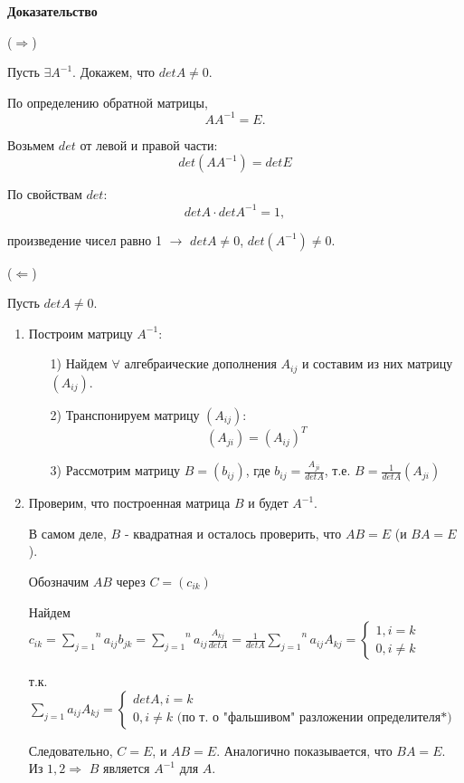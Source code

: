 {\bf {Доказательство}}

($\Rightarrow$)  

Пусть $\exists A^{-1}$. Докажем, что $detA \ne 0$.

По определению обратной матрицы, 
$$AA^{-1} = E.$$

Возьмем $det$ от левой и правой части:
$$det(AA^{-1}) = detE$$

По свойствам $det$:
$$detA\cdot detA^{-1} = 1,$$

произведение чисел равно 1 $\rightarrow$ $detA \ne 0$, $det(A^{-1}) \ne 0$.

\vspace*{15pt}

($\Leftarrow$)

Пусть $detA \ne 0$.

\begin{enumerate}
    \item Построим матрицу $A^{-1}:$
    \begin{enumerate}
        \item[1)] Найдем $\forall$ алгебраические дополнения $A_{ij}$ и составим из них матрицу $(A_{ij})$.
        \item[2)] Транспонируем матрицу $(A_{ij}):$
    $$(A_{ji}) = (A_{ij})^T$$
        \item[3)] Рассмотрим матрицу $B = (b_{ij})$, где $b_{ij} = \frac{A_{ji}}{detA}$, т.е. $B = \frac{1}{detA}(A_{ji})$
    \end{enumerate}
    \item Проверим, что построенная матрица $B$ и будет $A^{-1}$.

    В самом деле, $B$ - квадратная и осталось проверить, что $AB = E$ (и $BA = E$).

    Обозначим $AB$ через $C = (c_{ik})$

    Найдем $c_{ik} = \overset{n}{\underset{j = 1}{\sum}}a_{ij}b_{jk} = \overset{n}{\underset{j = 1}{\sum}}a_{ij}\frac{A_{kj}}{detA} = \frac{1}{detA}\overset{n}{\underset{j = 1}{\sum}}a_{ij}A_{kj} = \begin{cases}1, i = k\\ 0, i \ne k\end{cases}$ 
    
    т.к. ${\underset{j = 1}{\sum}}a_{ij}A_{kj} = \begin{cases}detA, i = k\\ 0, i \ne k \text{ (по т. о "фальшивом"\ разложении определителя*)}\end{cases}$

    Следовательно, $C = E$, и $AB = E$.
    Аналогично показывается, что $BA = E$.
    Из $1, 2 \Rightarrow$ $B$ является $A^{-1}$ для $A$.

\end{enumerate}

